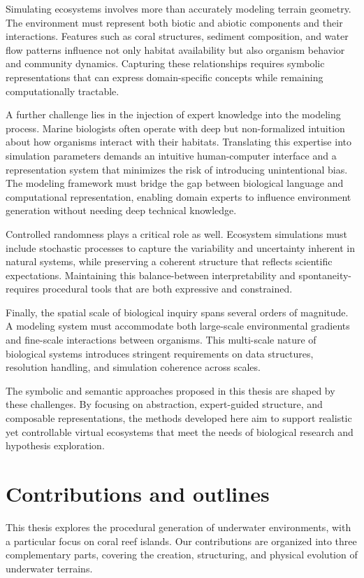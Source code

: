 Simulating ecosystems involves more than accurately modeling terrain geometry. The environment must represent both biotic and abiotic components and their interactions. Features such as coral structures, sediment composition, and water flow patterns influence not only habitat availability but also organism behavior and community dynamics. Capturing these relationships requires symbolic representations that can express domain-specific concepts while remaining computationally tractable.

A further challenge lies in the injection of expert knowledge into the modeling process. Marine biologists often operate with deep but non-formalized intuition about how organisms interact with their habitats. Translating this expertise into simulation parameters demands an intuitive human-computer interface and a representation system that minimizes the risk of introducing unintentional bias. The modeling framework must bridge the gap between biological language and computational representation, enabling domain experts to influence environment generation without needing deep technical knowledge.

Controlled randomness plays a critical role as well. Ecosystem simulations must include stochastic processes to capture the variability and uncertainty inherent in natural systems, while preserving a coherent structure that reflects scientific expectations. Maintaining this balance-between interpretability and spontaneity-requires procedural tools that are both expressive and constrained.

Finally, the spatial scale of biological inquiry spans several orders of magnitude. A modeling system must accommodate both large-scale environmental gradients and fine-scale interactions between organisms. This multi-scale nature of biological systems introduces stringent requirements on data structures, resolution handling, and simulation coherence across scales.

The symbolic and semantic approaches proposed in this thesis are shaped by these challenges. By focusing on abstraction, expert-guided structure, and composable representations, the methods developed here aim to support realistic yet controllable virtual ecosystems that meet the needs of biological research and hypothesis exploration.


\section{Contributions and outlines}
This thesis explores the procedural generation of underwater environments, with a particular focus on coral reef islands. Our contributions are organized into three complementary parts, covering the creation, structuring, and physical evolution of underwater terrains.

